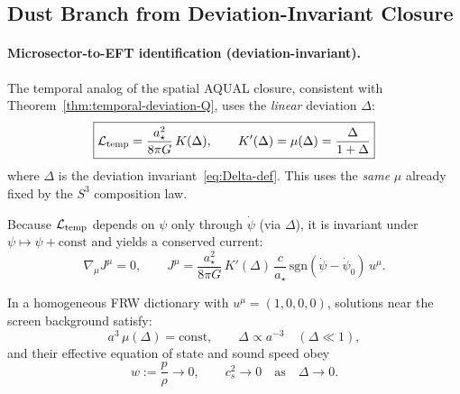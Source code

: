 \subsection{Dust Branch from Deviation-Invariant Closure}

\paragraph{Microsector-to-EFT identification (deviation-invariant).}
The temporal analog of the spatial AQUAL closure, consistent with Theorem~\ref{thm:temporal-deviation-Q}, uses the \emph{linear} deviation $\Delta$:
\begin{equation}
\boxed{\mathcal{L}_{\rm temp}=\frac{a_\star^2}{8\pi G}\,K(\Delta),\qquad K'(\Delta)=\mu(\Delta)=\frac{\Delta}{1+\Delta}}
\label{eq:K-Delta}
\end{equation}
where $\Delta$ is the deviation invariant~\eqref{eq:Delta-def}. This uses the \emph{same} $\mu$ already fixed by the $S^3$ composition law.

\begin{lemma}\label{lem:shift-current}
Because $\mathcal{L}_{\rm temp}$ depends on $\psi$ only through $\dot\psi$ (via $\Delta$), it is invariant under $\psi\mapsto\psi+\text{const}$ and yields a conserved current:
\begin{equation}
\nabla_\mu J^\mu=0,\qquad
J^\mu=\frac{a_\star^2}{8\pi G}\,K'(\Delta)\,\frac{c}{a_\star}\,\mathrm{sgn}(\dot\psi-\dot\psi_0)\,u^\mu.
\label{eq:conserved-current}
\end{equation}
\end{lemma}

\begin{theorem}\label{thm:dust-branch}
In a homogeneous FRW dictionary with $u^\mu=(1,0,0,0)$, solutions near the screen background satisfy:
\begin{equation}
a^3\,\mu(\Delta)=\text{const},\qquad \Delta\propto a^{-3}\quad(\Delta\ll 1),
\label{eq:Delta-scaling}
\end{equation}
and their effective equation of state and sound speed obey
\begin{equation}
\boxed{w:=\frac{p}{\rho}\to 0,\qquad c_s^2\to 0 \quad\text{as}\quad \Delta\to 0.}
\label{eq:dust-eos}
\end{equation}
\end{theorem}


